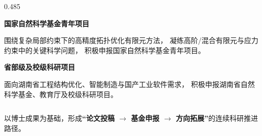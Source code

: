 \documentclass[notheorems]{beamer}
\begin{document}
\begin{frame}
\begin{columns}[T, totalwidth=\linewidth]
\begin{column}{0.485\linewidth}
\begin{tcolorbox}
					{\fontsize{7.5}{11}\selectfont\sffamily
						\textbf{\enspace 国家自然科学基金青年项目}\par
						\vspace{2pt}
						围绕复杂局部约束下的高精度拓扑优化有限元方法，
						凝练高阶/混合有限元与应力约束中的关键科学问题，
						积极申报国家自然科学基金青年项目。
						
						\vspace{6pt}
						
						\color{black}
						\textbf{\enspace 省部级及校级科研项目}\par
						\vspace{2pt}
						面向湖南省工程结构优化、智能制造与国产工业软件需求，
						积极申报湖南省自然科学基金、教育厅及校级科研项目。
					}
				\end{tcolorbox}
			\end{column}
			
		\end{columns}
		
		\begin{tcolorbox}[
			colback=structure.fg, colframe=structure.fg,
			arc=3pt, boxrule=0pt,
			top=4pt, bottom=4pt, left=8pt, right=8pt]
			\centering
			{\fontsize{8.5}{12}\selectfont\sffamily\color{white}
				以博士成果为基础，形成\textbf{“论文投稿 $\xrightarrow{}$ 基金申报 $\xrightarrow{}$ 方向拓展”}的连续科研推进路径。}
		\end{tcolorbox}
		
	\end{frame}
	
\end{document}
